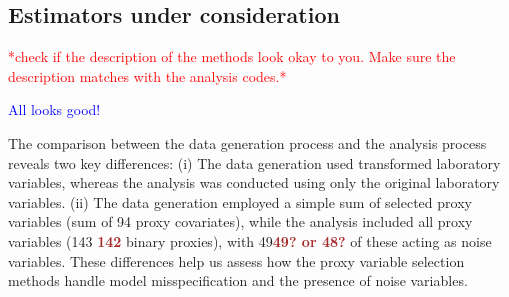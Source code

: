 \documentclass[sn-vancouver,Numbered,lineno,pdflatex]{sn-jnl}
\begin{document}
\subsection*{Estimators under
consideration}\label{estimators-under-consideration}

\textcolor{red}{*check if the description of the methods look okay to you. Make sure the description matches with the analysis codes.*}

\textcolor{blue}{All looks good!}

The comparison between the data generation process and the analysis
process reveals two key differences: (i) The data generation used
transformed laboratory variables, whereas the analysis was conducted
using only the original laboratory variables. (ii) The data generation
employed a simple sum of selected proxy variables (sum of 94 proxy
covariates), while the analysis included all proxy variables (143
\textcolor{brown}{\textbf{142}} binary proxies), with
49\textcolor{brown}{\textbf{49? or 48?}} of these acting as noise
variables. These differences help us assess how the proxy variable
selection methods handle model misspecification and the presence of
noise variables.
\end{document}
